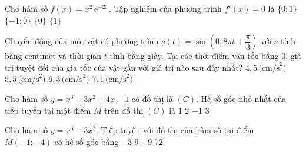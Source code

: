 \begin{ex}%
Cho hàm số $f(x)=x^2\mathrm{\, e}^{-2x}$. Tập nghiệm của phương trình $f'(x)=0$ là
	\choice 
	{\True $\{0;1\}$}
	{$\{-1;0\}$}
	{ $\{0\}$}
	{$\{1\}$}
\end{ex}
\begin{ex}%
	Chuyển động của một vật có phương trình $s(t)=\sin \left(0{,}8 \pi t+\dfrac{\pi}{3}\right)$ với $s$ tính bằng centimet và thời gian $t$ tình bằng giây. Tại các thời điểm vận tốc bằng $0$, giá trị tuyệt đối của gia tốc của vật gần với giá trị nào sau đây nhất?
	\choice
	{$4{,}5 \, \text{(cm/s}^2)$}
	{$5{,}5 \, \text{(cm/s}^2)$}
	{$6{,}3 \, \text{(cm/s}^2)$}
	{$7{,}1 \, \text{(cm/s}^2)$}
\end{ex}
\begin{ex}%
	Cho hàm số $y=x^3-3x^2+4x-1$ có đồ thị là $(C).$ Hệ số góc nhỏ nhất của tiếp tuyến tại một điểm $M$ trên đồ thị $(C) $ là
	\choice 
	{\True $1$}
	{$2$}
	{ $-1$}
	{$3$}
\end{ex}
\begin{ex}%
	Cho hàm số $y=x^3-3 x^2$. Tiếp tuyến với đồ thị của hàm số tại điểm $M(-1 ;-4)$ có hệ số góc bằng
	\choice
	{ $-3$}
	{\True $9$ }
	{ $-9$}
	{$72$}
\end{ex}
